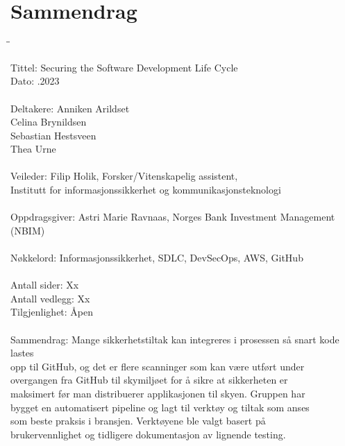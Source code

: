 \newpage
\chapter*{Sammendrag}

\begin{tabbing}
\hspace{2cm}\=\hspace{3cm}\=\kill %

Tittel: \> \> Securing the Software Development Life Cycle \\
Dato: \> .2023 \\ 
\\
Deltakere: \> \> Anniken Arildset \\ \> \> Celina Brynildsen \\ \> \> Sebastian Hestsveen \\ \> \> Thea Urne \\
\\
Veileder: \> \> Filip Holik, Forsker/Vitenskapelig assistent, \\\> \> Institutt for informasjonssikkerhet og kommunikasjonsteknologi \\
\\
Oppdragsgiver: \> \>  Astri Marie Ravnaas, Norges Bank Investment Management (NBIM) \\
\\
Nøkkelord: \> \> Informasjonssikkerhet, SDLC, DevSecOps, AWS, GitHub \\
\\
Antall sider: \> \> Xx \\
Antall vedlegg: \> \> Xx \\
Tilgjenlighet: \> \> Åpen \\
\\
Sammendrag: \> \>Mange sikkerhetstiltak kan integreres i prosessen så snart kode lastes \\\> \>opp til GitHub, og det er flere scanninger som kan være utført under \\\> \>overgangen fra GitHub til skymiljøet for å sikre at sikkerheten er \\\> \>maksimert før man distribuerer applikasjonen til skyen. Gruppen har \\\> \>bygget en automatisert pipeline og lagt til verktøy og tiltak som anses\\\> \> som beste praksis i bransjen. Verktøyene ble valgt basert på\\\> \> brukervennlighet og tidligere dokumentasjon av lignende testing.

\end{tabbing}



